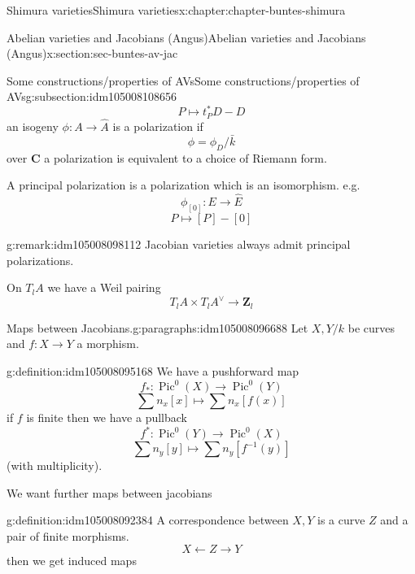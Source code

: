 \documentclass[oneside,10pt,]{book}
\numberwithin{equation}{section}
\newcommand{\inv}{^{-1}}
\newcommand{\ZZ}{\mathbf{Z}}
\newcommand{\CC}{\mathbf{C}}
\DeclareMathOperator{\Pic}{Pic}
\begin{document}
\begin{chapterptx}{Shimura varieties}{}{Shimura varieties}{}{}{x:chapter:chapter-buntes-shimura}
\begin{sectionptx}{Abelian varieties and Jacobians (Angus)}{}{Abelian varieties and Jacobians (Angus)}{}{}{x:section:sec-buntes-av-jac}
\begin{subsectionptx}{Some constructions\slash{}properties of AVs}{}{Some constructions\slash{}properties of AVs}{}{}{g:subsection:idm105008108656}
%
\begin{equation*}
P \mapsto t_P^* D -D
\end{equation*}
an isogeny \(\phi\colon A\to \hat A\) is a polarization if%
\begin{equation*}
\phi =  \phi_D /\bar k
\end{equation*}
over \(\CC\)  a polarization is equivalent to a choice of Riemann form.%
\par
A principal polarization is a polarization which is an isomorphism. e.g.%
\begin{equation*}
\phi_{[0]} \colon E \to \hat E
\end{equation*}
%
\begin{equation*}
P \mapsto [P] - [0]
\end{equation*}
%
\begin{remark}{}{g:remark:idm105008098112}%
Jacobian varieties always admit principal polarizations.%
\end{remark}
On \(T_lA \) we have  a Weil pairing%
\begin{equation*}
T_lA \times T_lA^\vee \to \ZZ_l
\end{equation*}
%
\begin{paragraphs}{Maps between Jacobians.}{g:paragraphs:idm105008096688}%
Let \(X,Y/k\) be curves and \(f\colon X \to Y\) a morphism.%
\begin{definition}{}{g:definition:idm105008095168}%
We have a pushforward map%
\begin{equation*}
f_*\colon \Pic^0(X) \to \Pic^0(Y)
\end{equation*}
%
\begin{equation*}
\sum n_x [x] \mapsto \sum n_x[f(x)]
\end{equation*}
if \(f\) is finite then we have  a pullback%
\begin{equation*}
f^* \colon \Pic^0(Y) \to \Pic^0(X)
\end{equation*}
%
\begin{equation*}
\sum n_y[y] \mapsto \sum n_y [f\inv (y)]
\end{equation*}
(with multiplicity).%
\end{definition}
We want further maps between jacobians%
\begin{definition}{}{g:definition:idm105008092384}%
A correspondence between \(X,Y\) is a curve \(Z\) and a pair of finite morphisms.%
\begin{equation*}
X \leftarrow Z \to Y
\end{equation*}
then we get induced maps%
\begin{equation*}

\end{equation*}
\end{definition}
\end{paragraphs}
\end{subsectionptx}
\end{sectionptx}
\end{chapterptx}
\end{document}
